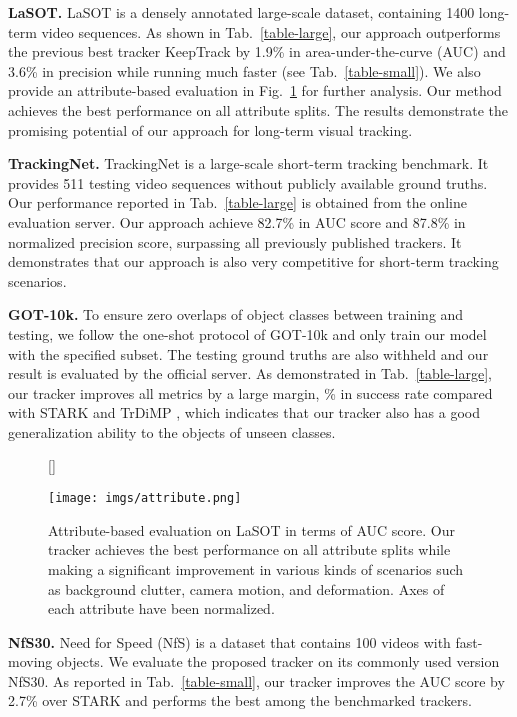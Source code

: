 \noindent\textbf{LaSOT.} LaSOT \cite{fan2019lasot} is a densely annotated large-scale dataset, containing 1400 long-term video sequences. As shown in Tab.~\ref{table-large}, our approach outperforms the previous best tracker KeepTrack \cite{mayer2021learning} by 1.9\% in area-under-the-curve (AUC) and 3.6\% in precision while running much faster (see Tab.~\ref{table-small}). We also provide an attribute-based evaluation in Fig.~\ref{figure-attribute} for further analysis. Our method achieves the best performance on all attribute splits. The results demonstrate the promising potential of our approach for long-term visual tracking.

\noindent\textbf{TrackingNet.} TrackingNet \cite{muller2018trackingnet} is a large-scale short-term tracking benchmark. It provides 511 testing video sequences without publicly available ground truths. Our performance reported in Tab.~\ref{table-large} is obtained from the online evaluation server. Our approach achieve 82.7\% in AUC score and 87.8\% in normalized precision score, surpassing all previously published trackers. It demonstrates that our approach is also very competitive for short-term tracking scenarios.

\noindent\textbf{GOT-10k.} To ensure zero overlaps of object classes between training and testing, we follow the one-shot protocol of GOT-10k \cite{huang2019got} and only train our model with the specified subset. The testing ground truths are also withheld and our result is evaluated by the official server. As demonstrated in Tab.~\ref{table-large}, our tracker improves all metrics by a large margin, \% in success rate compared with STARK \cite{yan2021learning} and TrDiMP \cite{wang2021transformer}, which indicates that our tracker also has a good generalization ability to the objects of unseen classes.

\begin{figure}[t]
[\FBwidth]
{\caption{Attribute-based evaluation on LaSOT in terms of AUC score. Our tracker achieves the best performance on all attribute splits while making a significant improvement in various kinds of scenarios such as background clutter, camera motion, and deformation. Axes of each attribute have been normalized.}
\label{figure-attribute}}
{\texttt{[image: imgs/attribute.png]}}
\end{figure}

\noindent\textbf{NfS30.} Need for Speed (NfS) \cite{kiani2017need} is a dataset that contains 100 videos with fast-moving objects. We evaluate the proposed tracker on its commonly used version NfS30. As reported in Tab.~\ref{table-small}, our tracker improves the AUC score by 2.7\% over STARK \cite{yan2021learning} and performs the best among the benchmarked trackers.

